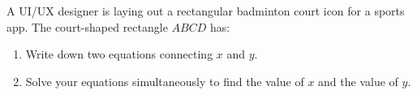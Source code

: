 \begin{question}
\noindent A UI/UX designer is laying out a rectangular badminton court icon for a sports app. The court-shaped rectangle $ABCD$ has:

\begin{center}
\end{center}


\begin{enumerate}
    \item[(a)] Write down two equations connecting $x$ and $y$.
    \vspace{2.5cm}

    \item[(b)] Solve your equations simultaneously to find the value of $x$ and the value of $y$.
    \vspace{5cm}
    \begin{flushright}
    \\[0.3cm]
    \end{flushright}
\end{enumerate}
\end{question}
